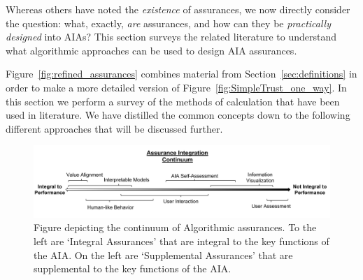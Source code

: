     Whereas others have noted the \textit{existence} of assurances, we now directly consider the question: what, exactly, \textit{are} assurances, and how can they be \textit{practically designed} into AIAs? 
    This section surveys the related literature to understand what algorithmic approaches can be used to design AIA assurances. 
    
    Figure~\ref{fig:refined_assurances} combines material from Section~\ref{sec:definitions} in order to make a more detailed version of Figure~\ref{fig:SimpleTrust_one_way}. In this section we perform a survey of the methods of calculation that have been used in literature. We have distilled the common concepts down to the following different approaches that will be discussed further.

    \begin{figure}[b]%
        \centering
        \includegraphics[width=1.0\textwidth]{Figures/Assurance_Integration.pdf}
        \caption{Figure depicting the continuum of Algorithmic assurances. To the left are `Integral Assurances' that are integral to the key functions of the AIA. On the left are `Supplemental Assurances' that are supplemental to the key functions of the AIA. }
        \label{fig:assurance_continuum}
    \end{figure}









